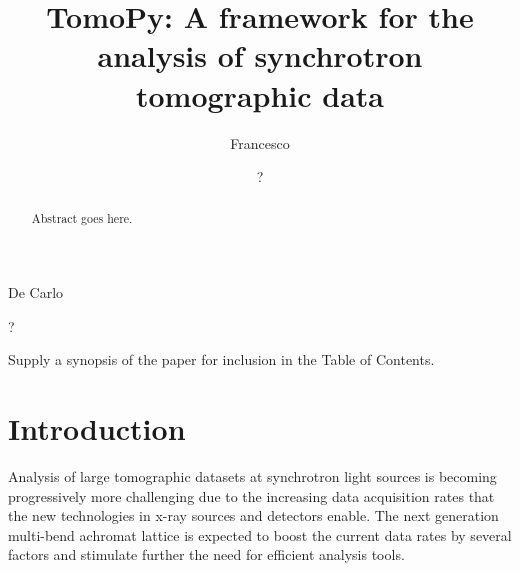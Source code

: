 \documentclass[pdf]{iucr}              %
\begin{document}



\title{TomoPy: A framework for the analysis of synchrotron tomographic data}


\author{Francesco}{De Carlo}
\author{?}{?}







\maketitle                        %

\begin{synopsis}
Supply a synopsis of the paper for inclusion in the Table of Contents.
\end{synopsis}

\begin{abstract}
Abstract goes here.
\end{abstract}


\section{Introduction}

Analysis of large tomographic datasets at synchrotron light sources is becoming progressively more challenging  due to the increasing data acquisition rates that the new technologies in x-ray sources and detectors enable. The next generation multi-bend achromat lattice is expected to boost the current data rates by several factors and stimulate further the need for efficient analysis tools. 
\end{document}
